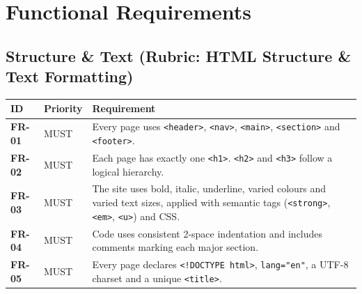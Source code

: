 \documentclass[11pt,a4paper]{article}
\newcommand{\req}[3]{\textbf{\color{accent}#1} & #2 & #3 \\}
\begin{document}
\section{Functional Requirements}

\subsection{Structure \& Text (Rubric: HTML Structure \& Text Formatting)}
\begin{longtable}{@{}p{1.6cm}p{1.6cm}p{12.3cm}@{}}
\toprule
\textbf{ID} & \textbf{Priority} & \textbf{Requirement} \\
\midrule
\endhead
\req{FR-01}{MUST}{Every page uses \texttt{<header>}, \texttt{<nav>}, \texttt{<main>}, \texttt{<section>} and \texttt{<footer>}.}
\req{FR-02}{MUST}{Each page has exactly one \texttt{<h1>}. \texttt{<h2>} and \texttt{<h3>} follow a logical hierarchy.}
\req{FR-03}{MUST}{The site uses bold, italic, underline, varied colours and varied text sizes, applied with semantic tags (\texttt{<strong>}, \texttt{<em>}, \texttt{<u>}) and CSS.}
\req{FR-04}{MUST}{Code uses consistent 2-space indentation and includes comments marking each major section.}
\req{FR-05}{MUST}{Every page declares \texttt{<!DOCTYPE html>}, \texttt{lang="en"}, a UTF-8 charset and a unique \texttt{<title>}.}
\bottomrule
\end{longtable}
\end{document}

